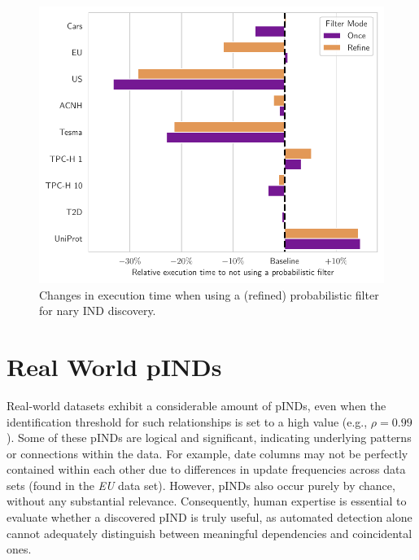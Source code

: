 \begin{figure}[t!]
    \centering
    \includegraphics[width=.6\textwidth]{figures/filter_results.pdf}
    \caption{Changes in execution time when using a (refined) probabilistic filter for nary IND discovery.}
    \label{fig:filter}
\end{figure}

\section{Real World pINDs} \label{subsec:real_pINDs}
Real-world datasets exhibit a considerable amount of pINDs, even when the identification threshold for such relationships is set to a high value (e.g., $\rho = 0.99$). Some of these pINDs are logical and significant, indicating underlying patterns or connections within the data. For example, date columns may not be perfectly contained within each other due to differences in update frequencies across data sets (found in the \textit{EU} data set). However, pINDs also occur purely by chance, without any substantial relevance. Consequently, human expertise is essential to evaluate whether a discovered pIND is truly useful, as automated detection alone cannot adequately distinguish between meaningful dependencies and coincidental ones.